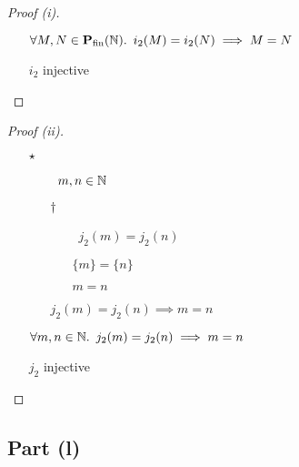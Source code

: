 \begin{prop}
\begin{proof}[Proof (i)]
\begin{itemize}
        \item[\imps]
          $\forall M, N\in\mathbf{P}_{\operatorname{fin}}(\mathbb{N})\ldotp~i_2(M) = i_2(N) \implies M = N$
          \marginnote{$\forall$-\Intro-$\star$}

        \item[\iffs]
          $i_2$ injective
          \qedhere
    \end{itemize}
  \end{proof}

  \begin{proof}[Proof (ii)]~\\
    \begin{itemize}
      \item[$\star$]
        \begin{itemize}
          \item[\phs]\Let~$m,n\in\mathbb{N}$
            \marginnote{\Hyp}

          \item[$\dagger$]
            \begin{itemize}
              \item[\phantom{\imps}]\Ass~$j_2(m) = j_2(n)$
                \marginnote{\Hyp}

              \item[\iffs]
                $\{m\} = \{n\}$

              \item[\iffs] $m = n$
            \end{itemize}
            \item[\imps]
              $j_2(m) = j_2(n) \implies m = n$
              \marginnote{\imps-\Intro-$\dagger$}
        \end{itemize}

        \item[\imps]
          $\forall m,n\in\mathbb{N}\ldotp~j_2(m) = j_2(n) \implies m = n$
          \marginnote{$\forall$-\Intro-$\star$}

        \item[\iffs]
          $j_2$ injective
          \qedhere
    \end{itemize}
  \end{proof}
\end{prop}

\subsection{Part (l)}\label{sec:q-2-l}
